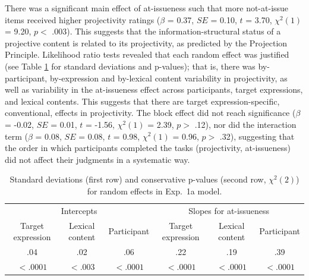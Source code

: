 \documentclass[11pt,fleqn]{article}
\newcommand{\6}{\mbox{$[\hspace*{-.6mm}[$}}
\newcommand{\9}{\mbox{$]\hspace*{-.6mm}]$}}
\newcommand{\tableref}[1]{Table \ref{#1}}
\begin{document}
There was a significant main effect of at-issueness such that more not-at-issue items received higher projectivity ratings ($\beta$ = 0.37, $SE$ = 0.10, $t$ = 3.70, $\chi^2(1)$ = 9.20, $p <$ .003). This suggests that the information-structural status of a projective content is related to its projectivity, as predicted by the Projection Principle. Likelihood ratio tests revealed that each random effect was justified (see \tableref{tab:random1a} for standard deviations and p-values); that is, there was by-participant, by-expression and by-lexical content variability in projectivity, as well as variability in the at-issueness effect across participants, target expressions, and lexical contents. This suggests that there are target expression-specific, conventional, effects in projectivity. The block effect did not reach significance ($\beta$ = -0.02, $SE$ = 0.01, $t$ = -1.56, $\chi^2(1)$ = 2.39, $p >$ .12), nor did the interaction term ($\beta$ = 0.08, $SE$ = 0.08, $t$ = 0.98, $\chi^2(1)$ = 0.96, $p >$ .32), suggesting that the order in which participants completed the tasks (projectivity, at-issueness) did not affect their judgments in a systematic way. 


\begin{table}
\caption{Standard deviations (first row) and conservative p-values (second row, $\chi^2(2)$) for random effects in Exp.~1a model.}
\begin{tabular}{c c c c c c }
\toprule
\multicolumn{3}{c}{Intercepts} & \multicolumn{3}{c}{Slopes for at-issueness}\\
Target expression & Lexical content & Participant & Target expression & Lexical content & Participant\\
\midrule
.04 & .02 & .06 & .22 & .19 & .39\\
$< .0001$ & $< .003$ & $< .0001$ & $< .0001$ & $< .0001$ & $< .0001$ \\
\bottomrule
\end{tabular}
\label{tab:random1a}
\end{table}
\end{document}
